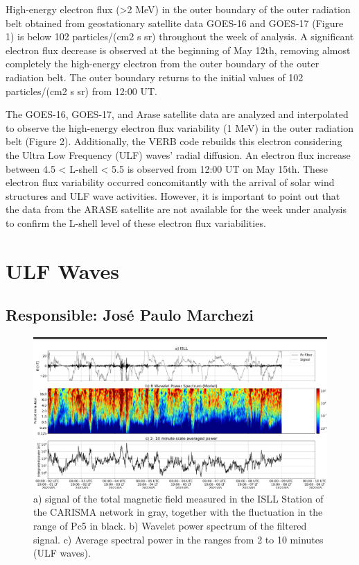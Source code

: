 \documentclass[a4paper, 10pt]{article}
\begin{document}
                     High-energy electron flux (>2 MeV) in the outer boundary of the outer radiation belt obtained from geostationary satellite data GOES-16 and GOES-17 (Figure 1) is below 102 particles/(cm2 s sr) throughout the week of analysis. A significant electron flux decrease is observed at the beginning of May 12th, removing almost completely the high-energy electron from the outer boundary of the outer radiation belt. The outer boundary returns to the initial values  of 102 particles/(cm2 s sr) from 12:00 UT.    

The GOES-16, GOES-17, and Arase satellite data are analyzed and interpolated to observe the high-energy electron flux variability (1 MeV) in the outer radiation belt (Figure 2). Additionally, the VERB code rebuilds this electron considering the Ultra Low Frequency (ULF) waves' radial diffusion. An electron flux increase between 4.5 < L-shell < 5.5 is observed from 12:00 UT on May 15th. These electron flux variability occurred concomitantly with the arrival of solar wind structures and ULF wave activities. However, it is important to point out that the data from the ARASE satellite are not available for the week under analysis to confirm the L-shell level of these electron flux variabilities.\section{ULF Waves} 
 \subsection{Responsible: José Paulo Marchezi} 
 
\begin{figure}[H]
    
                        \centering
   
                             \includegraphics[width=14cm]{./figures//figureULF_0.png}

                             \caption{a) signal of the total magnetic 
                              field measured in the ISLL Station of the CARISMA 
                              network in gray, together with the fluctuation in the 
                              range of Pc5 in black. b) Wavelet power spectrum of the 
                              filtered signal. c) Average spectral power in the ranges 
                              from 2 to 10 minutes (ULF waves).}
                        \end{figure}
\end{document}
